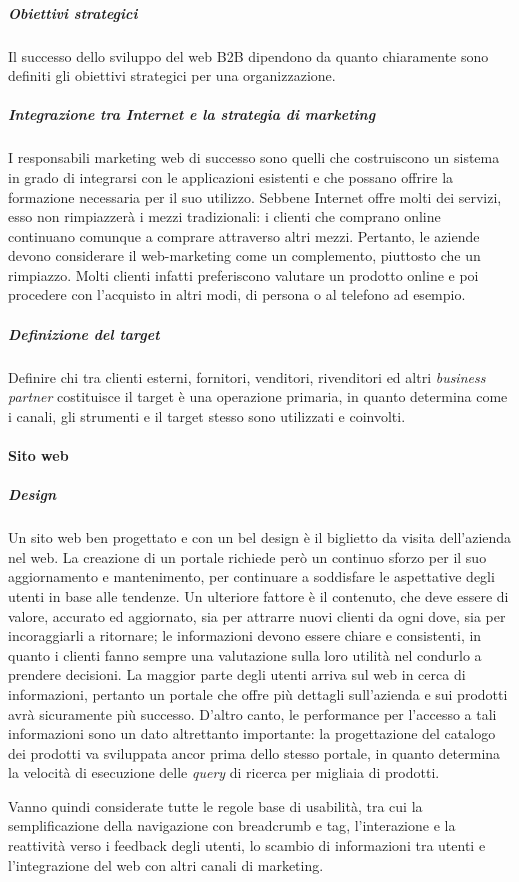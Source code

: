 \subparagraph{Obiettivi strategici}
Il successo dello sviluppo del web B2B dipendono da quanto chiaramente sono definiti gli obiettivi strategici per una organizzazione.

\subparagraph{Integrazione tra Internet e la strategia di marketing}
I responsabili marketing web di successo sono quelli che costruiscono un sistema in grado di integrarsi con le applicazioni esistenti e che possano offrire la formazione necessaria per il suo utilizzo. Sebbene Internet offre molti dei servizi, esso non rimpiazzerà i mezzi tradizionali: i clienti che comprano online continuano comunque a comprare attraverso altri mezzi. Pertanto, le aziende devono considerare il web-marketing come un complemento, piuttosto che un rimpiazzo. Molti clienti infatti preferiscono valutare un prodotto online e poi procedere con l'acquisto in altri modi, di persona o al telefono ad esempio.

\subparagraph{Definizione del target}
Definire chi tra clienti esterni, fornitori, venditori, rivenditori ed altri \textit{business partner} costituisce il target è una operazione primaria, in quanto determina come i canali, gli strumenti e il target stesso sono utilizzati e coinvolti.

\paragraph{Sito web}
\subparagraph{Design}
Un sito web ben progettato e con un bel design è il biglietto da visita dell'azienda nel web. La creazione di un portale richiede però un continuo sforzo per il suo aggiornamento e mantenimento, per continuare a soddisfare le aspettative degli utenti in base alle tendenze. Un ulteriore fattore è il contenuto, che deve essere di valore, accurato ed aggiornato, sia per attrarre nuovi clienti da ogni dove, sia per incoraggiarli a ritornare; le informazioni devono essere chiare e consistenti, in quanto i clienti fanno sempre una valutazione sulla loro utilità nel condurlo a prendere decisioni. La maggior parte degli utenti arriva sul web in cerca di informazioni, pertanto un portale che offre più dettagli sull'azienda e sui prodotti avrà sicuramente più successo. D'altro canto, le performance per l'accesso a tali informazioni sono un dato altrettanto importante: la progettazione del catalogo dei prodotti va sviluppata ancor prima dello stesso portale, in quanto determina la velocità di esecuzione delle \textit{query} di ricerca per migliaia di prodotti.

Vanno quindi considerate tutte le regole base di usabilità, tra cui la semplificazione della navigazione con \gls{breadcrumb} e \gls{tag}, l'interazione e la reattività verso i \gls{feedback} degli utenti, lo scambio di informazioni tra utenti e l'integrazione del web con altri canali di marketing.\autocite{b2bSuccessFactors}

